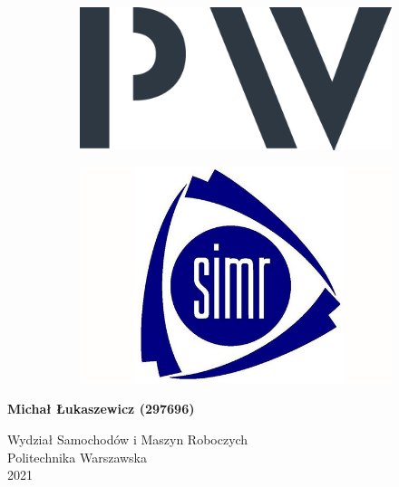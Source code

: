 \begin{titlepage}

   \begin{figure}
    \caption*{}
        \begin{subfigure}{.5\linewidth}    
            \centering
            \includegraphics[width=.6\linewidth]{../tex/pw_logo.png}
        \end{subfigure}
        \begin{subfigure}{.5\linewidth}    
            \centering
            \includegraphics[width=.6\linewidth]{../tex/simr_logo.jpg}
        \end{subfigure}
    \end{figure}

	\begin{center}
		
	\vspace*{0.2\textheight}

	\begin{Large}
	\textbf{\className}
	\end{Large}

	\vspace{0.5cm}
	
	\begin{large}
		\workTitle
	\end{large}
	
	\vspace{1.5cm}

	\textbf{Michał Łukaszewicz (297696)}

	\vfill

	Wydział Samochodów i Maszyn Roboczych\\
	Politechnika Warszawska\\
	2021
	
		
	\end{center}
\end{titlepage}
